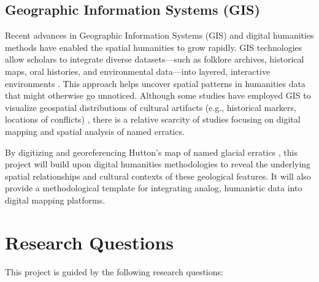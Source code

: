 \documentclass{article}
\begin{document}
\subsection{Geographic Information Systems (GIS)}\label{sec:GIS}
Recent advances in Geographic Information Systems (GIS) \cite{Elghazaly2023} and digital humanities methods have enabled the spatial humanities to grow rapidly. GIS technologies allow scholars to integrate diverse datasets—such as folklore archives, historical maps, oral histories, and environmental data—into layered, interactive environments \cite{Mennecke1996, ESRI2011, Butler2016}. This approach helps uncover spatial patterns in humanities data that might otherwise go unnoticed. Although some studies have employed GIS to visualize geospatial distributions of cultural artifacts (e.g., historical markers, locations of conflicts) \cite{BennettMaitlandGilgenbachPeasha2017, McKeenFiddes2021}, there is a relative scarcity of studies focusing on digital mapping and spatial analysis of named erratics.

By digitizing and georeferencing Hutton's map of named glacial erratics \cite{Hutton2012}, this project will build upon digital humanities methodologies to reveal the underlying spatial relationships and cultural contexts of these geological features. It will also provide a methodological template for integrating analog, humanistic data into digital mapping platforms.

\section{Research Questions}
This project is guided by the following research questions:
\end{document}
